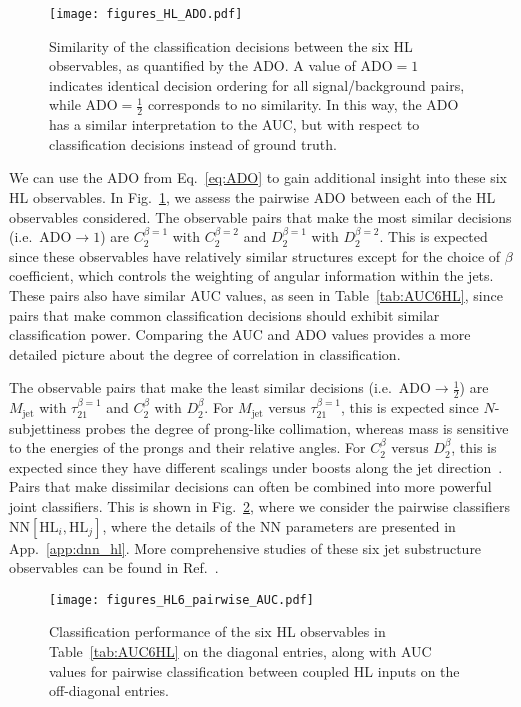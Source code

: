 \documentclass[aps,prd,twocolumn,superscriptaddress,preprintnumbers,nofootinbib,longbibliography,floatfix]{revtex4-1}
\newcommand{\NN}{\text{NN}}
\newcommand{\HL}{\text{HL}}
\newcommand{\ADO}{\text{ADO}}
\newcommand{\rref}[1]{Ref.~\cite{#1}}
\newcommand{\Fig}[1]{Fig.~\ref{#1}}
\newcommand{\Tab}[1]{Table~\ref{#1}}
\newcommand{\App}[1]{App.~\ref{#1}}
\newcommand{\Eq}[1]{Eq.~\eqref{#1}}
\begin{document}
\begin{figure}[t]
	\centering
	\texttt{[image: figures\_HL\_ADO.pdf]}
	\caption{Similarity of the classification decisions between the six HL observables, as quantified by the ADO. A value of $\ADO=1$ indicates identical decision ordering for all signal/background pairs, while $\ADO=\frac{1}{2}$ corresponds to no similarity. In this way, the ADO has a similar interpretation to the AUC, but with respect to classification decisions instead of ground truth.}
	\label{fig:HL_vs_HL_ADO2D}
\end{figure}

We can use the ADO from \Eq{eq:ADO} to gain additional insight into these six HL observables. In \Fig{fig:HL_vs_HL_ADO2D}, we assess the pairwise ADO between each of the HL observables considered. The observable pairs that make the most similar decisions (i.e.\ $\ADO \rightarrow 1$) are $C^{\beta=1}_{2}$ with $C^{\beta=2}_{2}$ and $D^{\beta=1}_{2}$ with $D^{\beta=2}_{2}$. This is expected since these observables have relatively similar structures except for the choice of $\beta$ coefficient, which controls the weighting of angular information within the jets. These pairs also have similar AUC values, as seen in \Tab{tab:AUC6HL}, since pairs that make common classification decisions should exhibit similar classification power. Comparing the AUC and ADO values provides a more detailed picture about the degree of correlation in classification.

The observable pairs that make the least similar decisions (i.e.\ $\ADO \rightarrow \frac{1}{2}$) are $M_{\text{jet}}$ with $\tau^{\beta=1}_{21}$ and $C^{\beta}_{2}$ with $D^{\beta}_{2}$. For $M_{\text{jet}}$ versus $\tau^{\beta=1}_{21}$, this is expected since $N$-subjettiness probes the degree of prong-like collimation, whereas mass is sensitive to the energies of the prongs and their relative angles. For $C^{\beta}_{2}$ versus $D^{\beta}_{2}$, this is expected since they have different scalings under boosts along the jet direction~\cite{Larkoski:2014gra}. Pairs that make dissimilar decisions can often be combined into more powerful joint classifiers. This is shown in \Fig{fig:pairwiseAUC6HL}, where we consider the pairwise classifiers $\NN[\HL_i,\HL_j]$, where the details of the NN parameters are presented in \App{app:dnn_hl}. More comprehensive studies of these six jet substructure observables can be found in \rref{Adams:2015hiv}.

\begin{figure}[t]
	\centering
	\texttt{[image: figures\_HL6\_pairwise\_AUC.pdf]}
	\caption{Classification performance of the six HL observables in \Tab{tab:AUC6HL} on the diagonal entries, along with AUC values for pairwise classification between coupled HL inputs on the off-diagonal entries.
	}
	\label{fig:pairwiseAUC6HL}
\end{figure}
\end{document}
